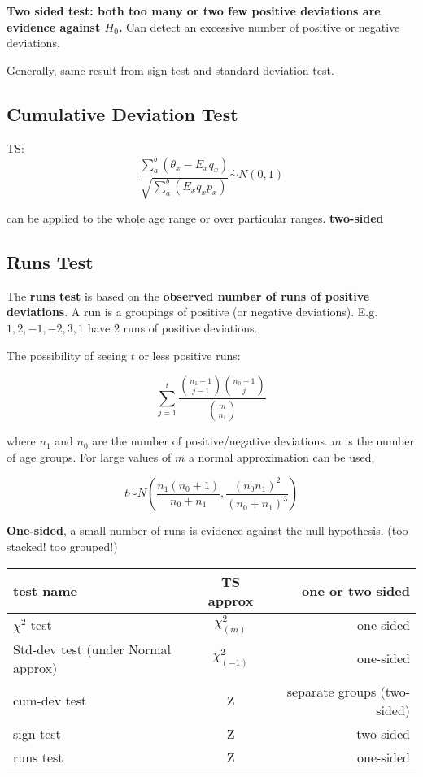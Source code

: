 \documentclass[a4paper]{article}
\begin{document}
\textbf{Two sided test: both too many or two few positive deviations are evidence against $H_0$.} Can detect an excessive number of positive or negative deviations.

Generally, same result from sign test and standard deviation test.

\subsection{Cumulative Deviation Test}

TS: $$\frac{\sum^b_a(\theta_x-E_xq_x)}{\sqrt{\sum^b_a(E_xq_xp_x)}}\overset{\cdot}\sim N(0,1)$$

can be applied to the whole age range or over particular ranges. \textbf{two-sided}

\subsection{Runs Test}

The \textbf{runs test} is based on the \textbf{observed number of runs of positive deviations}. A run is a groupings of positive (or negative deviations). E.g. $1,2,-1,-2,3,1$ have 2 runs of positive deviations.

The possibility of seeing $t$ or less positive runs:

$$\sum^t_{j=1}\frac{{n_1-1\choose j-1}{n_0+1\choose j}}{{m\choose n_1}}$$

where $n_1$ and $n_0$ are the number of positive/negative deviations. $m$ is the number of age groups. For large values of $m$ a normal approximation can be used,

$$t\overset{\cdot}\sim N\left(\frac{n_1(n_0+1)}{n_0+n_1},\frac{(n_0n_1)^2}{(n_0+n_1)^3}\right)$$

\textbf{One-sided}, a small number of runs is evidence against the null hypothesis. (too stacked! too grouped!)

\begin{table}[htbp!] 
	\centering
	\begin{tabular}{|l|c|r|}
		\hline
		test name & TS approx & one or two sided \\
		\hline
		$\chi^2$ test & $\chi^2_{(m)}$ & one-sided\\
		\hline
		Std-dev test (under Normal approx) & $\chi^2_{(-1)}$ & one-sided\\
		\hline
		cum-dev test & Z & separate groups (two-sided)\\
		\hline
		sign test & Z & two-sided\\
		\hline
		runs test & Z & one-sided\\
		\hline
	\end{tabular}
\end{table}
\end{document}
